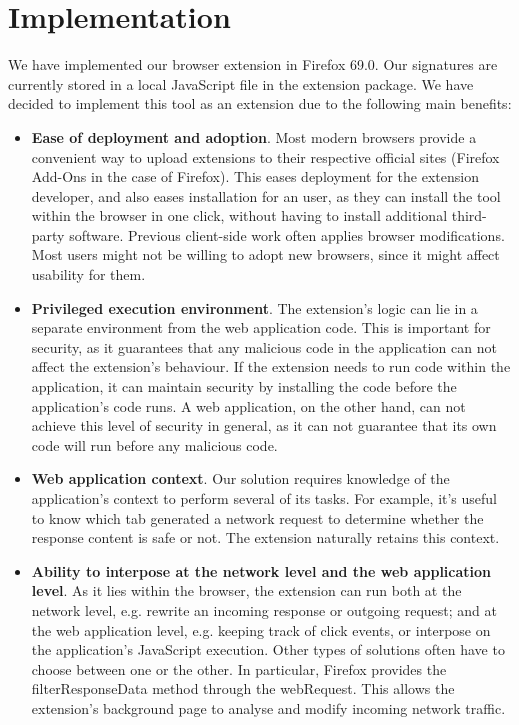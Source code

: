 \section{Implementation} \label{implementation}

We have implemented our browser extension in Firefox 69.0. Our signatures are currently stored in a local JavaScript file in the extension package. We have decided to implement this tool as an extension due to the following main benefits:
\begin{itemize}
	\item \textbf{Ease of deployment and adoption}. Most modern browsers provide a convenient way to upload extensions to their respective official sites (Firefox Add-Ons in the case of Firefox). This eases deployment for the extension developer, and also eases installation for an user, as they can install the tool within the browser in one click, without having to install additional third-party software. Previous client-side work often applies browser modifications. Most users might not be willing to adopt new browsers, since it might affect usability for them.
	\item \textbf{Privileged execution environment}. The extension's logic can lie in a separate environment from the web application code. This is important for security, as it guarantees that any malicious code in the application can not affect the extension's behaviour. If the extension needs to run code within the application, it can maintain security by installing the code before the application's code runs. A web application, on the other hand, can not achieve this level of security in general, as it can not guarantee that its own code will run before any malicious code.
	\item \textbf{Web application context}. Our solution requires knowledge of the application's context to perform several of its tasks. For example, it's useful to know which tab generated a network request to determine whether the response content is safe or not. The extension naturally retains this context.
	\item \textbf{Ability to interpose at the network level and the web application level}. As it lies within the browser, the extension can run both at the network level, e.g. rewrite an incoming response or outgoing request; and at the web application level, e.g. keeping track of click events, or interpose on the application's JavaScript execution. Other types of solutions often have to choose between one or the other. In particular, Firefox provides the filterResponseData method through the webRequest. This allows the extension's background page to analyse and modify incoming network traffic.
\end{itemize}

